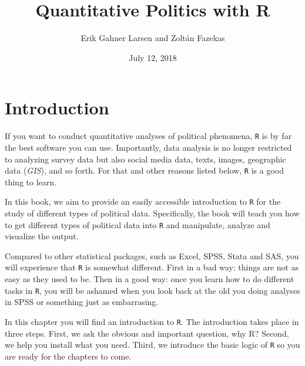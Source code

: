 \documentclass[12pt,oneside]{reedthesis}
\title{\Huge{ Quantitative Politics with R } \vspace{2em}}
\author{Erik Gahner Larsen and Zoltán Fazekas}
\date{July 12, 2018}
\theoremstyle{definition}
\theoremstyle{definition}
\theoremstyle{definition}
\theoremstyle{remark}
\begin{document}
      \maketitle
  
  \frontmatter %
  \pagestyle{empty} %

  
  
      \hypersetup{linkcolor=black}
    \setcounter{tocdepth}{2}
    \tableofcontents
  
  
  
  
  
  \mainmatter %
  \pagestyle{fancyplain} %

  \chapter{Introduction}\label{introduction}
  
  If you want to conduct quantitative analyses of political phenomena,
  \texttt{R} is by far the best software you can use. Importantly, data
  analysis is no longer restricted to analyzing survey data but also
  social media data, texts, images, geographic data (\emph{GIS}), and so
  forth. For that and other reasons listed below, \texttt{R} is a good
  thing to learn.
  
  In this book, we aim to provide an easily accessible introduction to
  \texttt{R} for the study of different types of political data.
  Specifically, the book will teach you how to get different types of
  political data into \texttt{R} and manipulate, analyze and visualize the
  output.
  
  Compared to other statistical packages, such as Excel, SPSS, Stata and
  SAS, you will experience that \texttt{R} is somewhat different. First in
  a bad way: things are not as easy as they used to be. Then in a good
  way: once you learn how to do different tasks in \texttt{R}, you will be
  ashamed when you look back at the old you doing analyses in SPSS or
  something just as embarrasing.
  
  In this chapter you will find an introduction to \texttt{R}. The
  introduction takes place in three steps. First, we ask the obvious and
  important question, why R? Second, we help you install what you need.
  Third, we introduce the basic logic of \texttt{R} so you are ready for
  the chapters to come.
  
\end{document}
